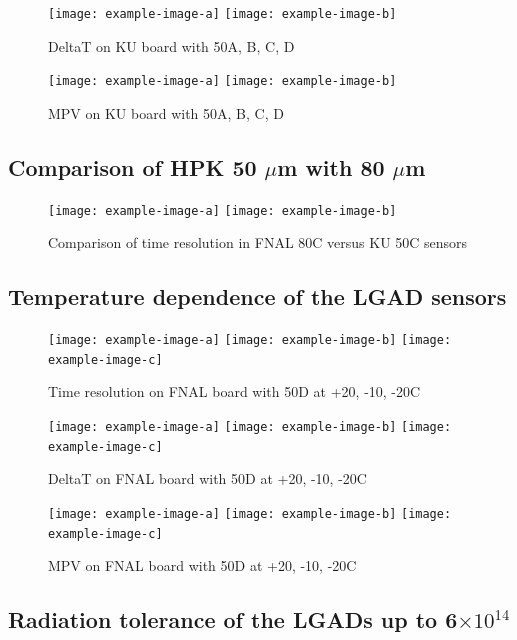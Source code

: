 \documentclass[preprint,1p]{elsarticle}
\begin{document}
\begin{figure}[htbp] 
\centering
\texttt{[image: example-image-a]} 
\texttt{[image: example-image-b]} 
\caption{DeltaT on KU board with 50A, B, C, D } 
\label{fig:Sensors} 
\end{figure} 

\begin{figure}[htbp] 
\centering
\texttt{[image: example-image-a]} 
\texttt{[image: example-image-b]} 
\caption{MPV on KU board with 50A, B, C, D } 
\label{fig:Sensors} 
\end{figure} 



\subsection{Comparison of HPK 50 $\mu$m with 80 $\mu$m}

\begin{figure}[htbp] 
\centering
\texttt{[image: example-image-a]} 
\texttt{[image: example-image-b]} 
\caption{Comparison of time resolution in FNAL 80C versus KU 50C sensors } 
\label{fig:Sensors} 
\end{figure} 


\subsection{Temperature dependence of the LGAD sensors}

\begin{figure}[htbp] 
\centering
\texttt{[image: example-image-a]} 
\texttt{[image: example-image-b]} 
\texttt{[image: example-image-c]} 
\caption{Time resolution on FNAL board with 50D at +20, -10, -20C} 
\label{fig:Sensors} 
\end{figure} 

\begin{figure}[htbp] 
\centering
\texttt{[image: example-image-a]} 
\texttt{[image: example-image-b]} 
\texttt{[image: example-image-c]} 
\caption{DeltaT on FNAL board with 50D at +20, -10, -20C} 
\label{fig:Sensors} 
\end{figure} 


\begin{figure}[htbp] 
\centering
\texttt{[image: example-image-a]} 
\texttt{[image: example-image-b]} 
\texttt{[image: example-image-c]} 
\caption{MPV on FNAL board with 50D at +20, -10, -20C} 
\label{fig:Sensors} 
\end{figure} 

\subsection{Radiation tolerance of the LGADs up to 6$\times 10^{14}$}
\end{document}
